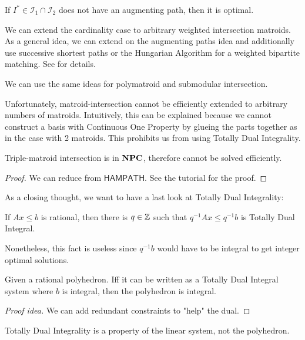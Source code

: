 \begin{corollary}
    If $I^* \in \mathcal I_1 \cap \mathcal I_2$ does not have an augmenting path, then it is optimal.
\end{corollary}
\begin{remark}
    We can extend the cardinality case to arbitrary weighted intersection matroids.
    As a general idea, we can extend on the augmenting paths idea and additionally use successive shortest paths
    or the Hungarian Algorithm for a weighted bipartite matching.
    See \cite[Ch.~8]{comb-optimization-cook} for details.
\end{remark}
\begin{remark}
    We can use the same ideas for polymatroid and submodular intersection.
\end{remark}
Unfortunately, matroid-intersection cannot be efficiently extended to arbitrary numbers of matroids.
Intuitively, this can be explained because we cannot construct a basis with
Continuous One Property by glueing the parts together
as in the case with 2 matroids. This prohibits us from using Totally Dual Integrality.
\begin{theorem}
    Triple-matroid intersection is in $\mathbf{NPC}$, therefore cannot be solved efficiently.
\end{theorem}
\begin{proof}
    We can reduce from $\mathsf{HAMPATH}$. See the tutorial for the proof.
\end{proof}
As a closing thought, we want to have a last look at Totally Dual Integrality:
\begin{theorem}
    If $Ax \leq b$ is rational, then there is $q \in \mathbb{Z}$ such that $q^{-1}Ax \leq q^{-1}b$
    is Totally Dual Integral.
\end{theorem}
Nonetheless, this fact is useless since $q^{-1}b$ would have to be integral to get integer optimal solutions.
\begin{theorem}
    Given a rational polyhedron. Iff it can be written as a Totally Dual Integral system
    where $b$ is integral, then the polyhedron is integral.
\end{theorem}
\begin{proof}[Proof idea]
    We can add redundant constraints to "help" the dual.
\end{proof}
\begin{conclusion}
    Totally Dual Integrality is a property of the linear system, not the polyhedron.
\end{conclusion}
